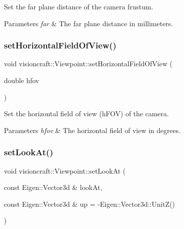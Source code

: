 Set the far plane distance of the camera frustum. 


\begin{DoxyParams}{Parameters}
{\em far} & The far plane distance in millimeters. \\
\hline
\end{DoxyParams}
\mbox{\label{classvisioncraft_1_1Viewpoint_a578ce8d3f798e63ebfdd07407f3a6769}} 
\subsubsection{\texorpdfstring{set\+Horizontal\+Field\+Of\+View()}{setHorizontalFieldOfView()}}
{\footnotesize\ttfamily void visioncraft\+::\+Viewpoint\+::set\+Horizontal\+Field\+Of\+View (\begin{DoxyParamCaption}\item[{double}]{hfov }\end{DoxyParamCaption})}



Set the horizontal field of view (h\+F\+OV) of the camera. 


\begin{DoxyParams}{Parameters}
{\em hfov} & The horizontal field of view in degrees. \\
\hline
\end{DoxyParams}
\mbox{\label{classvisioncraft_1_1Viewpoint_ab3245e3767522f4f88cde55bdda58965}} 
\subsubsection{\texorpdfstring{set\+Look\+At()}{setLookAt()}}
{\footnotesize\ttfamily void visioncraft\+::\+Viewpoint\+::set\+Look\+At (\begin{DoxyParamCaption}\item[{const Eigen\+::\+Vector3d \&}]{look\+At,  }\item[{const Eigen\+::\+Vector3d \&}]{up = {\ttfamily -\/Eigen\+:\+:Vector3d\+:\+:UnitZ()} }\end{DoxyParamCaption})}




